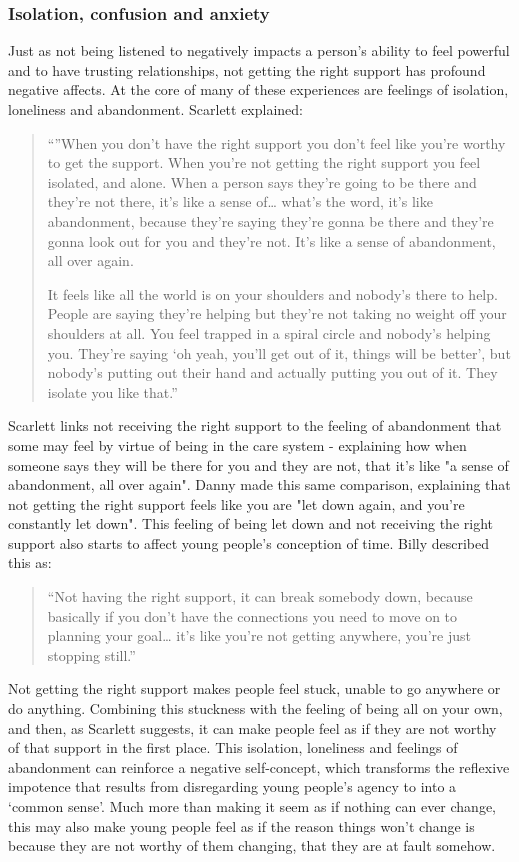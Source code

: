 \subsubsection{Isolation, confusion and anxiety}
Just as not being listened to negatively impacts a person's ability to feel powerful and to have trusting relationships, not getting the right support has profound negative affects. At the core of many of these experiences are feelings of isolation, loneliness and abandonment. Scarlett explained:
\begin{quote}
“”When you don’t have the right support you don’t feel like you’re worthy to get the support. When you’re not getting the right support you feel isolated, and alone. When a person says they’re going to be there and they’re not there, it’s like a sense of… what’s the word, it’s like abandonment, because they’re saying they’re gonna be there and they’re gonna look out for you and they’re not. It’s like a sense of abandonment, all over again. 

It feels like all the world is on your shoulders and nobody’s there to help. People are saying they’re helping but they’re not taking no weight off your shoulders at all. You feel trapped in a spiral circle and nobody’s helping you. They’re saying ‘oh yeah, you’ll get out of it, things will be better’, but nobody’s putting out their hand and actually putting you out of it. They isolate you like that.”
\end{quote}
Scarlett links not receiving the right support to the feeling of abandonment that some may feel by virtue of being in the care system - explaining how when someone says they will be there for you and they are not, that it's like "a sense of abandonment, all over again". Danny made this same comparison, explaining that not getting the right support feels like you are "let down again, and you're constantly let down". This feeling of being let down and not receiving the right support also starts to affect young people’s conception of time. Billy described this as:
\begin{quote}
“Not having the right support, it can break somebody down, because basically if you don’t have the connections you need to move on to planning your goal… it’s like you’re not getting anywhere, you’re just stopping still.”
\end{quote}
Not getting the right support makes people feel stuck, unable to go anywhere or do anything. Combining this stuckness with the feeling of being all on your own, and then, as Scarlett suggests, it can make people feel as if they are not worthy of that support in the first place. This isolation, loneliness and feelings of abandonment can reinforce a negative self-concept, which transforms the reflexive impotence that results from disregarding young people’s agency to into a ‘common sense’. Much more than making it seem as if nothing can ever change, this may also make young people feel as if the reason things won’t change is because they are not worthy of them changing, that they are at fault somehow. 

